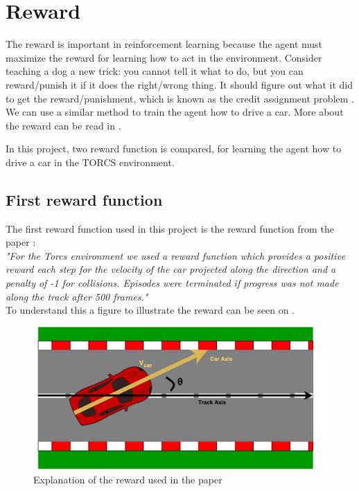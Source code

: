 \section{Reward}\label{sectionReward}
The reward is important in reinforcement learning because the agent must maximize the reward for learning how to act in the environment. Consider teaching a dog a new trick: you cannot tell it what to do, but you can reward/punish it if it does the right/wrong thing. It should figure out what it did to get the reward/punishment, which is known as the credit assignment problem \cite{reward_small}. We can use a similar method to train the agent how to drive a car. More about the reward can be read in .  

In this project, two reward function is compared, for learning the agent how to drive a car in the TORCS environment.  

\subsection*{First reward function}
The first reward function used in this project is the reward function from the paper \cite{DBLP:journals/corr/LillicrapHPHETS15}: \\
\textit{"For the Torcs environment we used a reward function which provides a positive reward each step for the velocity of the car projected along the direction and a penalty of -1 for collisions. Episodes were terminated if progress was not made along the track after 500 frames."}\\
To understand this a figure to illustrate the reward can be seen on .

\begin{figure}[H]
	\centering
	\includegraphics[width=1\textwidth]{Figures/Result/Reward_paper.pdf}
	\caption{Explanation of the reward used in the paper \cite{DBLP:journals/corr/LillicrapHPHETS15} }
	\label{fig:Reward_paper}
\end{figure}

